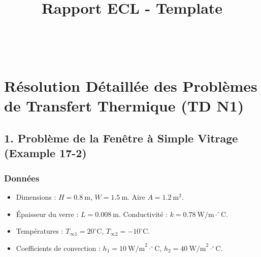 \documentclass{rapportECL}
\title{Rapport ECL - Template} %
\begin{document}



\\

        
\fairemarges %
\fairepagedegarde %
\tabledematieres %











\section*{Résolution Détaillée des Problèmes de Transfert Thermique (TD N1)}

\subsection*{1. Problème de la Fenêtre à Simple Vitrage (Example 17-2)}
\subsubsection*{Données}
\begin{itemize}
    \item Dimensions : $H=0.8 \ \text{m}$, $W=1.5 \ \text{m}$. Aire $A = 1.2 \ \text{m}^2$. 
    \item Épaisseur du verre : $L = 0.008 \ \text{m}$. Conductivité : $k = 0.78 \ \text{W/m}\cdot^\circ\text{C}$. 
    \item Températures : $T_{\infty 1} = 20^\circ\text{C}$, $T_{\infty 2} = -10^\circ\text{C}$. 
    \item Coefficients de convection : $h_1 = 10 \ \text{W/m}^2\cdot^\circ\text{C}$, $h_2 = 40 \ \text{W/m}^2\cdot^\circ\text{C}$. 
\end{itemize}
\end{document}
